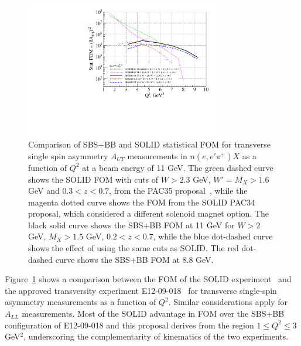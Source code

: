 \begin{figure}[h]
  \begin{center}
    \includegraphics[width=0.75\textwidth]{figures/SBS_SOLID_FOM_comparison_Q2.pdf}
  \end{center}
  \caption{\label{SBS_SOLID_FOM_Q2} Comparison of SBS+BB and SOLID statistical FOM for transverse single spin asymmetry $A_{UT}$ measurements in $n(e,e'\pi^+)X$ as a function of $Q^2$ at a beam energy of 11 GeV. The green dashed curve shows the SOLID FOM with cuts of $W > 2.3$ GeV, $W' = M_X > 1.6$ GeV and $0.3 < z < 0.7$, from the PAC35 proposal~\cite{SOLID_SIDIS_TRANS_3He}, while the magenta dotted curve shows the FOM from the SOLID PAC34 proposal, which considered a different solenoid magnet option. The black solid curve shows the SBS+BB FOM at 11 GeV for $W > 2$ GeV, $M_X > 1.5$ GeV, $0.2 < z < 0.7$, while the blue dot-dashed curve shows the effect of using the same cuts as SOLID. The red dot-dashed curve shows the SBS+BB FOM at 8.8 GeV. }
\end{figure}
Figure~\ref{SBS_SOLID_FOM_Q2} shows a comparison between the FOM of the SOLID experiment~\cite{SOLID_SIDIS_TRANS_3He} and the approved transversity experiment E12-09-018~\cite{SBS_SIDIS} for transverse single-spin asymmetry measurements as a function of $Q^2$. Similar considerations apply for $A_{LL}$ measurements. Most of the SOLID advantage in FOM over the SBS+BB configuration of E12-09-018 and this proposal derives from the region $1 \le Q^2 \le 3$ GeV$^2$, underscoring the complementarity of kinematics of the two experiments.  
